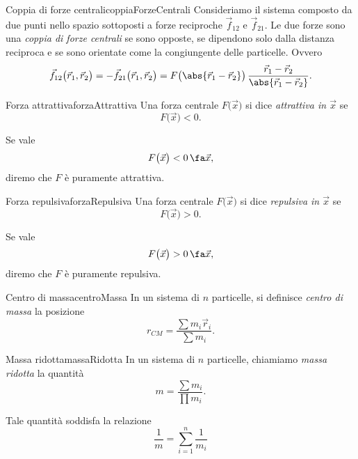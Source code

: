 \begin{defn}{Coppia di forze centrali}{coppiaForzeCentrali}
	Consideriamo il sistema composto da due punti nello spazio sottoposti a forze reciproche \(\vec{f}_{12}\) e \(\vec{f}_{21}\).
	Le due forze sono una \emph{coppia di forze centrali} se sono opposte, se dipendono solo dalla distanza reciproca e se sono orientate come la congiungente delle particelle. Ovvero
	\[
		\vec{f}_{12}\big(\vec{r}_1,\vec{r}_2\big) = -\vec{f}_{21}\big(\vec{r}_1,\vec{r}_2\big) = F\big(\abs{\vec{r}_1-\vec{r}_2}\big)\,\frac{\vec{r}_1-\vec{r}_2}{\abs{\vec{r}_1-\vec{r}_2}}.
	\]
\end{defn}

\begin{defn}{Forza attrattiva}{forzaAttrattiva}
	Una forza centrale \(F\big(\vec{x}\big)\) si dice \emph{attrattiva in \(\vec{x}\)} se
	\[
		F\big(\vec{x}\big) < 0.
	\]
\end{defn}

\begin{notz}
	Se vale
	\[
		F\big(\vec{x}\big) < 0 \,\fa \vec{x},
	\]
	diremo che \(F\) è puramente attrattiva.
\end{notz}

\begin{defn}{Forza repulsiva}{forzaRepulsiva}
	Una forza centrale \(F\big(\vec{x}\big)\) si dice \emph{repulsiva in \(\vec{x}\)} se
	\[
		F\big(\vec{x}\big) > 0.
	\]
\end{defn}

\begin{notz}
	Se vale
	\[
		F\big(\vec{x}\big) > 0 \,\fa \vec{x},
	\]
	diremo che \(F\) è puramente repulsiva.
\end{notz}

\begin{defn}{Centro di massa}{centroMassa}
	In un sistema di \(n\) particelle, si definisce \emph{centro di massa} la posizione
	\[
		r_{CM} = \frac{\sum m_i \vec{r}_i}{\sum m_i}.
	\]
\end{defn}

\begin{defn}{Massa ridotta}{massaRidotta}
	In un sistema di \(n\) particelle, chiamiamo \emph{massa ridotta} la quantità
	\[
		m = \frac{\sum m_i}{\prod m_i}.
	\]
\end{defn}

\begin{oss}
	Tale quantità soddisfa la relazione
	\[
		\frac{1}{m} = \sum_{i=1}^n \frac{1}{m_i}
	\]
\end{oss}
